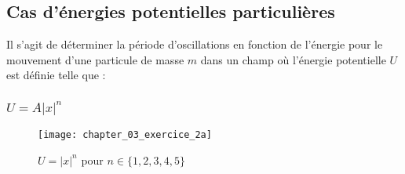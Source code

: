 \subsection{Cas d'\'energies potentielles particuli\`eres}

Il s'agit de d\'eterminer la p\'eriode d'oscillations en fonction de l'\'energie pour le mouvement d'une particule de masse $m$ dans un champ o\`u l'\'energie potentielle $U$ est d\'efinie telle que :

\subsubsection{$U = A\lvert x \rvert^{n}$}

\begin{figure}[htb!]
	\begin{center}
		\texttt{[image: chapter\_03\_exercice\_2a]}
		\caption{$U = \lvert x \rvert^{n}$ pour $n \in \{1,2,3,4,5\}$}\label{FIG:3_2_a}
	\end{center}
\end{figure}

